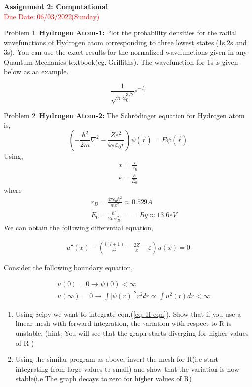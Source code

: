 \documentclass[11pt]{article}
\begin{document}
\begin{center}
	\textbf{Assignment 2: Computational} \\
\textcolor{red}{Due Date: 06/03/2022(Sunday)}
\end{center}


\begin{flushleft}
		Problem 1: \textbf{Hydrogen Atom-1:} Plot the probability densities for the radial wavefunctions of Hydrogen atom corresponding to three lowest states (1s,2s and 3s). You can use the exact results for the normalized wavefunctions given in any Quantum Mechanics textbook(eg. Griffiths). The wavefunction for 1s is given below as an example.
		
		\begin{equation*}
			\frac{1}{\sqrt{\pi}a_0^{3/2}} e^ {-\frac{r}{a_0}}
		\end{equation*}
	
	
	Problem 2: \textbf{Hydrogen Atom-2:} The Schr\"{o}dinger equation for Hydrogen atom is, 
	\begin{equation*}
		(-\frac{\hbar^2}{2m}\nabla^2-\frac{Z e^2}{4\pi\varepsilon_0 r})\psi(\vec{r})=E \psi(\vec{r})
		\end{equation*}
	Using, 
	\begin{eqnarray*}
		x = \frac{r}{r_B}\\
		\varepsilon = \frac{E}{E_0}
	\end{eqnarray*}
	where
	\begin{eqnarray*}\label{eq: H-eqn}
		&& r_B = \frac{4\pi\varepsilon_0 \hbar^2}{m e^2} \approx 0.529 A\\
		&& E_0 = \frac{\hbar^2}{2 m r_B^2} == Ry \approx 13.6 eV
	\end{eqnarray*}
We can obtain the following differential equation,

\begin{eqnarray}
	u''(x)-
	\left(\frac{l(l+1)}{x^2}-\frac{2Z}{x}-\varepsilon\right)u(x)=0
\end{eqnarray}

Consider the following boundary equation, 

\begin{eqnarray*}
	&&u(0) = 0 \rightarrow \psi(0)<\infty\\
	&&u(\infty)=0 \rightarrow \int |\psi(r)|^2 r^2 dr \propto \int u^2(r)dr < \infty
\end{eqnarray*}


\end{flushleft}

\begin{enumerate}
	\item Using Scipy we want to integrate eqn.(\ref{eq: H-eqn}). Show that if you use a linear mesh with forward integration, the variation with respect to R is unstable. (hint: You will see that the graph starts diverging for higher values of R )
	
	\item Using the similar program as above, invert the mesh for R(i.e start integrating from large values to small) and show that the variation is now stable(i.e The graph decays to zero for higher values of R)
\end{enumerate}
\end{document}
